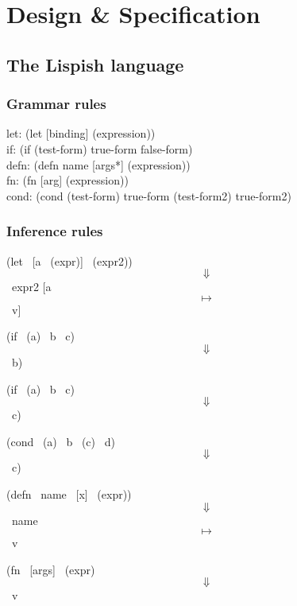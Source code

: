 \chapter{Design \& Specification}

\section{The Lispish language}

\subsection{Grammar rules}

let: (let [binding] (expression)) \\
if: (if (test-form) true-form false-form) \\
defn: (defn name [args*] (expression)) \\
fn: (fn [arg] (expression)) \\
cond: (cond (test-form) true-form (test-form2) true-form2) \\


\subsection{Inference rules}

{(let \ {[a \ (expr)]} \ (expr2)) \ $$\Downarrow$$ \ expr2 {[}a \ $$\mapsto$$ \ v{]} }

{(if \ (a) \ b \ c) \ $$\Downarrow$$ \ b) }

{(if \ (a) \ b \ c) \ $$\Downarrow$$ \ c) }

{(cond \ (a) \ b \ (c) \ d) \ $$\Downarrow$$ \ c) }


{(defn \ name \ {[x]} \ (expr)) \ $$\Downarrow$$ \ name \ $$\mapsto$$ \ v }

{(fn \ {[args]}  \ (expr) \ $$\Downarrow$$ \ v }
